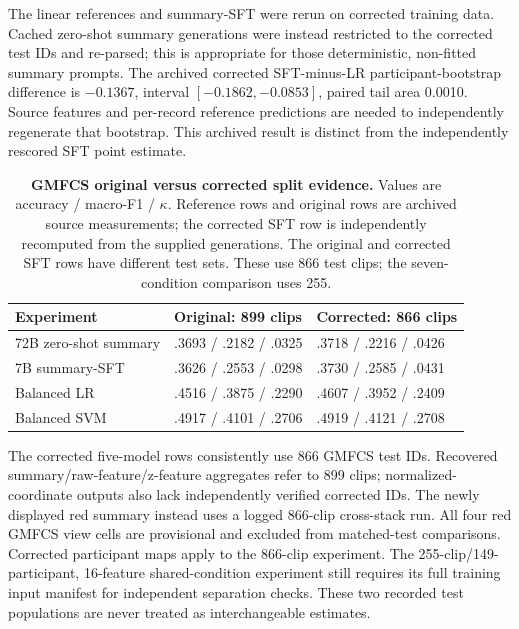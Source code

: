 The linear references and summary-SFT were rerun on corrected training data. Cached zero-shot summary generations were instead restricted to the corrected test IDs and re-parsed; this is appropriate for those deterministic, non-fitted summary prompts. The archived corrected SFT-minus-LR participant-bootstrap difference is $-0.1367$, interval $[-0.1862,-0.0853]$, paired tail area 0.0010. Source features and per-record reference predictions are needed to independently regenerate that bootstrap. This archived result is distinct from the independently rescored SFT point estimate.

\begin{table}[H]
\centering\small
\caption{\textbf{GMFCS original versus corrected split evidence.} Values are accuracy / macro-F1 / $\kappa$. Reference rows and original rows are archived source measurements; the corrected SFT row is independently recomputed from the supplied generations. The original and corrected SFT rows have different test sets. These use 866 test clips; the seven-condition comparison uses 255.}
\label{tab:supp_repair_details}
\begin{tabular}{lll}\toprule
Experiment & Original: 899 clips & Corrected: 866 clips\\\midrule
72B zero-shot summary & .3693 / .2182 / .0325 & .3718 / .2216 / .0426\\
7B summary-SFT & .3626 / .2553 / .0298 & .3730 / .2585 / .0431\\
Balanced LR & .4516 / .3875 / .2290 & .4607 / .3952 / .2409\\
Balanced SVM & .4917 / .4101 / .2706 & .4919 / .4121 / .2708\\\bottomrule
\end{tabular}
\end{table}

The corrected five-model rows consistently use 866 GMFCS test IDs. Recovered summary/raw-feature/z-feature aggregates refer to 899 clips; normalized-coordinate outputs also lack independently verified corrected IDs. The newly displayed red summary instead uses a logged 866-clip cross-stack run. All four red GMFCS view cells are provisional and excluded from matched-test comparisons. Corrected participant maps apply to the 866-clip experiment. The 255-clip/149-participant, 16-feature shared-condition experiment still requires its full training input manifest for independent separation checks. These two recorded test populations are never treated as interchangeable estimates.

